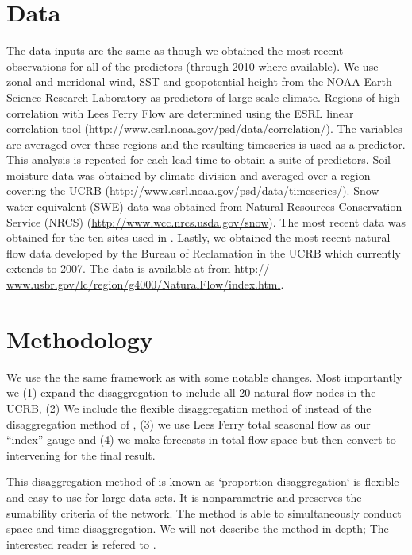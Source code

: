 \documentclass[11pt]{article}
\begin{document}
\section{Data}

The data inputs are the same as \citep{Bracken:2010p2682} though we obtained the most recent observations for all of the predictors (through 2010 where available).  We use zonal and meridonal wind, SST and geopotential height from the NOAA Earth Science Research Laboratory as predictors of large scale climate.  Regions of high correlation with Lees Ferry Flow are determined using the ESRL linear correlation tool (\url{http://www.esrl.noaa.gov/psd/data/correlation/}). The variables are averaged over these regions and the resulting timeseries is used as a predictor.  This analysis is repeated for each lead time to obtain a suite of predictors.  Soil moisture data was obtained by climate division and averaged over a region covering the UCRB (\url{http://www.esrl.noaa.gov/psd/data/timeseries/)}.   Snow water equivalent (SWE) data was obtained from Natural Resources Conservation Service (NRCS) (\url{http://www.wcc.nrcs.usda.gov/snow}).  The most recent data was obtained for the ten sites used in \citep{Bracken:2010p2682}. Lastly, we obtained the most recent natural flow data developed by the Bureau of Reclamation in the UCRB which currently extends to 2007. The data is available at from \url{http:// www.usbr.gov/lc/region/g4000/NaturalFlow/index.html}. 



\section{Methodology}

We use the the same framework as \cite{Bracken:2010p2682} with some notable changes. Most importantly we (1) expand the disaggregation to include all 20 natural flow nodes in the UCRB, (2) We include the flexible disaggregation method of \cite{Nowak:2010p2738} instead of the disaggregation method of \cite{Prairie:2007p481}, (3) we use Lees Ferry total seasonal flow as our ``index'' gauge and (4) we make forecasts in total flow space but then convert to intervening for the final result. 

This disaggregation method of \cite{Nowak:2010p2738} is known as `proportion disaggregation` is flexible and easy to use for large data sets.  It is nonparametric and preserves the sumability criteria of the network. The method is able to simultaneously conduct space and time disaggregation. We will not describe the method in depth; The interested reader is refered to \cite{Nowak:2010p2738}. 
\end{document}
